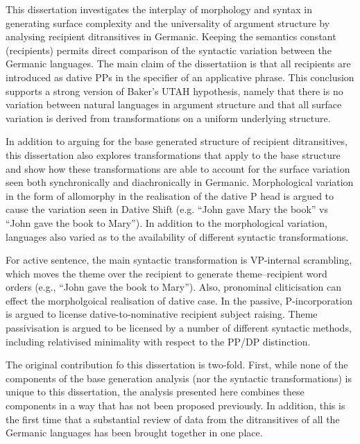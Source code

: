 This dissertation investigates the interplay of morphology and syntax in generating surface complexity and the universality of argument structure by analysing recipient ditransitives in Germanic. Keeping the semantics constant (recipients) permits direct comparison of the syntactic variation between the Germanic languages. The main claim of the dissertatiion is that all recipients are introduced as dative PPs in the specifier of an applicative phrase. This conclusion supports a strong version of Baker's UTAH hypothesis, namely that there is no variation between natural languages in argument structure and that all surface variation is derived from transformations on a uniform underlying structure.

In addition to arguing for the base generated structure of recipient ditransitives, this dissertation also explores transformations that apply to the base structure and show how these transformations are able to account for the surface variation seen both synchronically and diachronically in Germanic. Morphological variation in the form of allomorphy in the realisation of the dative P head is argued to cause the variation seen in Dative Shift (e.g. ``John gave Mary the book'' vs ``John gave the book to Mary''). In addition to the morphological variation, languages also varied as to the availability of different syntactic transformations.

For active sentence, the main syntactic transformation is VP-internal scrambling, which moves the theme over the recipient to generate theme--recipient word orders (e.g., ``John gave the book to Mary''). Also, pronominal cliticisation can effect the morpholgoical realisation of dative case. In the passive, P-incorporation is argued to license dative-to-nominative recipient subject raising. Theme passivisation is argued to be licensed by a number of different syntactic methods, including relativised minimality with respect to the PP/DP distinction.

The original contribution fo this dissertation is two-fold. First, while none of the components of the base generation analysis (nor the syntactic transformations) is unique to this dissertation, the analysis presented here combines these components in a way that has not been proposed previously. In addition, this is the first time that a substantial review of data from the ditransitives of all the Germanic languages has been brought together in one place.

